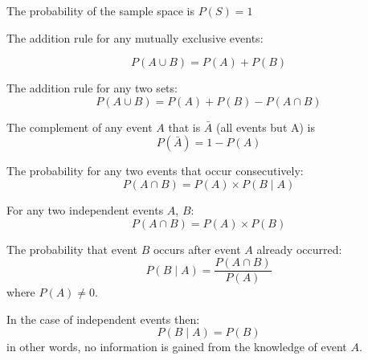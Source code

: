 \documentclass[11pt]{article}
\begin{document}
The probability of the sample space is $P(S) = 1$

\begin{definition}\label{def:addition-rule}
    The addition rule for any mutually exclusive events:
    
    \begin{equation*}
        P (A \cup B) = P (A) + P(B)
    \end{equation*}

    The addition rule for any two sets:
    \begin{equation*}
        P (A \cup B) = P (A) + P(B) - P(A \cap B)
    \end{equation*}
\end{definition}

\begin{definition}\label{def:complement-rule}
    The complement of any event $A$ that is $\bar{A}$ (all events but A) is
    \begin{equation*}
        P(\bar{A}) = 1 - P(A)
    \end{equation*}
\end{definition}

\begin{definition}\label{def:multiplication-rule}
    The probability for any two events that occur consecutively:
    \begin{equation*}
        P (A \cap B) = P(A) \times P(B \mid A)
    \end{equation*}

    For any two independent events $A$, $B$:
    \begin{equation*}
        P (A \cap B) = P(A) \times P(B)
    \end{equation*}
\end{definition}

\begin{definition}\label{def:conditional-probability}
    The probability that event $B$ occurs after event $A$ already occurred:
    \begin{equation*}
        P (B \mid A) = \frac{P(A \cap B)}{P(A)}
    \end{equation*}
    where $P(A) \neq 0$.

    In the case of independent events then:
    \begin{equation*}
        P (B \mid A) = P(B)
    \end{equation*}
    in other words, no information is gained from the knowledge of event $A$.
\end{definition}
\end{document}
